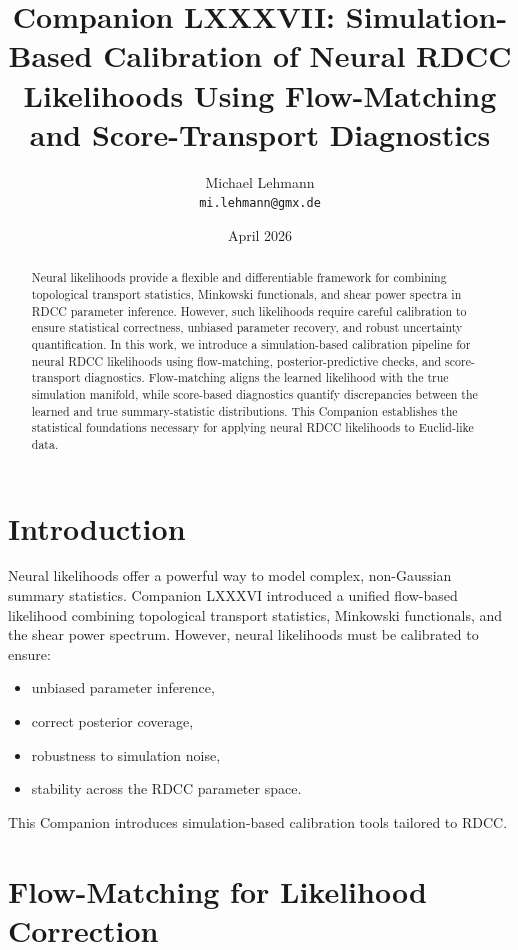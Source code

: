 \documentclass[11pt,a4paper]{article}
\title{\textbf{Companion LXXXVII: Simulation-Based Calibration of Neural RDCC Likelihoods Using Flow-Matching and Score-Transport Diagnostics}}
\author{Michael Lehmann \\ \texttt{mi.lehmann@gmx.de}}
\date{April 2026}
\begin{document}
\maketitle

\begin{abstract}
Neural likelihoods provide a flexible and differentiable framework for combining 
topological transport statistics, Minkowski functionals, and shear power spectra 
in RDCC parameter inference. However, such likelihoods require careful 
calibration to ensure statistical correctness, unbiased parameter recovery, and 
robust uncertainty quantification. In this work, we introduce a simulation-based 
calibration pipeline for neural RDCC likelihoods using flow-matching, 
posterior-predictive checks, and score-transport diagnostics. Flow-matching 
aligns the learned likelihood with the true simulation manifold, while 
score-based diagnostics quantify discrepancies between the learned and true 
summary-statistic distributions. This Companion establishes the statistical 
foundations necessary for applying neural RDCC likelihoods to Euclid-like data.
\end{abstract}
\section{Introduction}

Neural likelihoods offer a powerful way to model complex, non-Gaussian summary 
statistics. Companion LXXXVI introduced a unified flow-based likelihood combining 
topological transport statistics, Minkowski functionals, and the shear power 
spectrum. However, neural likelihoods must be calibrated to ensure:

\begin{itemize}
    \item unbiased parameter inference,
    \item correct posterior coverage,
    \item robustness to simulation noise,
    \item stability across the RDCC parameter space.
\end{itemize}

This Companion introduces simulation-based calibration tools tailored to RDCC.
\section{Flow-Matching for Likelihood Correction}
\end{document}
